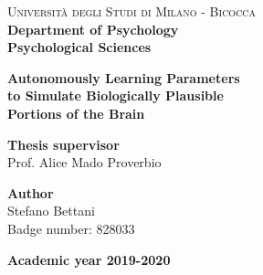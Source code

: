 \begin{titlepage}
	
	\noindent
	\begin{minipage}[t]{0.19\textwidth}
	\end{minipage}
	\begin{minipage}[t]{0.81\textwidth}
	{
			{\textsc{Università degli Studi di Milano - Bicocca}} \\
			\textbf{Department of Psychology} \\
			\textbf{Psychological Sciences} \\
			\par
	}
	\end{minipage}
	
\vspace{40mm}
	
\begin{center}
		{\LARGE{
				\textbf{Autonomously Learning Parameters \\ to Simulate Biologically Plausible \\ Portions of the Brain}
				\par
		}}
	\end{center}
	
	\vspace{50mm}

	\noindent
	{\large \textbf{Thesis supervisor}} \\
	\large{Prof. Alice Mado Proverbio } \\

	\vspace{15mm}

	\begin{flushright}
		{\large \textbf{Author}} \\
		\large{Stefano Bettani} \\
		\large{Badge number: 828033} 
	\end{flushright}
	
	\vspace{30mm}
	\begin{center}
		{\large{\bf Academic year 2019-2020}}
	\end{center}

	\restoregeometry
	
\end{titlepage}
